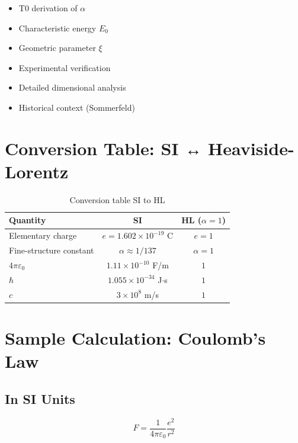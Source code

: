 	\begin{itemize}
		\item T0 derivation of $\alpha$
		\item Characteristic energy $E_0$
		\item Geometric parameter $\xi$
		\item Experimental verification
		\item Detailed dimensional analysis
		\item Historical context (Sommerfeld)
	\end{itemize}
	
	\appendix
	
	\section{Conversion Table: SI ↔ Heaviside-Lorentz}
	
	\begin{table}[h]
		\centering
		\begin{tabular}{|l|c|c|}
			\hline
			\textbf{Quantity} & \textbf{SI} & \textbf{HL ($\alpha = 1$)} \\
			\hline
			Elementary charge & $e = 1.602 \times 10^{-19}$ C & $e = 1$ \\
			Fine-structure constant & $\alpha \approx 1/137$ & $\alpha = 1$ \\
			$4\pi\varepsilon_0$ & $1.11 \times 10^{-10}$ F/m & $1$ \\
			$\hbar$ & $1.055 \times 10^{-34}$ J$\cdot$s & $1$ \\
			$c$ & $3 \times 10^8$ m/s & $1$ \\
			\hline
		\end{tabular}
		\caption{Conversion table SI to HL}
	\end{table}
	
	\section{Sample Calculation: Coulomb's Law}
	
	\subsection{In SI Units}
	
	\begin{equation}
		F = \frac{1}{4\pi\varepsilon_0} \frac{e^2}{r^2}
	\end{equation}
	
